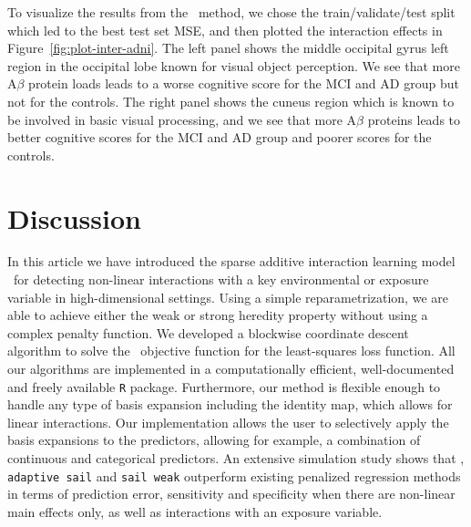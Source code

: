 To visualize the results from the \sail ~method, we chose the train/validate/test split which led to the best test set MSE, and then plotted the interaction effects in Figure~\ref{fig:plot-inter-adni}. The left panel shows the middle occipital gyrus left region in the occipital lobe known for visual object perception. We see that more A$\beta$ protein loads leads to a worse cognitive score for the MCI and AD group but not for the controls. The right panel shows the cuneus region which is known to be involved in basic visual processing, and we see that more A$\beta$ proteins leads to better cognitive scores for the MCI and AD group and poorer scores for the controls. 







\section{Discussion} \label{sec:sail_discussion}

In this article we have introduced the sparse additive interaction learning model \sail ~for detecting non-linear interactions with a key environmental or exposure variable in high-dimensional settings. 
Using a simple reparametrization, we are able to achieve either the weak or strong heredity property without using a complex penalty function. We developed a blockwise coordinate descent algorithm to solve the \sail ~objective function for the least-squares loss function. 
All our algorithms are implemented in a computationally efficient, well-documented and freely available \texttt{R} package. 
Furthermore, our method is flexible enough to handle any type of basis expansion including the identity map, which allows for linear interactions. Our implementation allows the user to selectively apply the basis expansions to the predictors, allowing for example, a combination of continuous and categorical predictors. 
An extensive simulation study shows that \sail, \texttt{adaptive sail} and \texttt{sail weak} outperform existing penalized regression methods in terms of prediction error, sensitivity and specificity when there are non-linear main effects only, as well as interactions with an exposure variable. 

